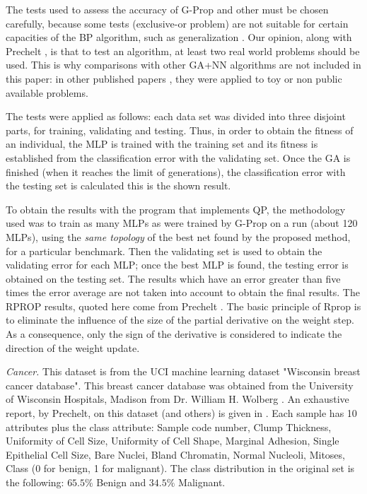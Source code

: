 \documentclass{elsart}
\begin{document}
The tests used to assess the accuracy of G-Prop and other must be chosen carefully, because some tests (exclusive-or problem) are not suitable for certain capacities of the BP algorithm, such as generalization \cite{FahlmanBENCHMARKS}. Our opinion, along with Prechelt \cite{Prechelt94c}, is that to test an algorithm, at least two real world problems should be used.
This is why comparisons with other GA+NN algorithms are not included in this paper: in other published papers \cite{White,Miller,Kitano90,Gruau92}, they were applied to toy or non public available problems.

The tests were applied as follows: each data set was divided into three disjoint parts, for training, validating and testing. Thus, in order to obtain the fitness of an individual, the MLP is trained with the training set and its fitness is established from the classification error with the validating set. 
Once the GA is finished (when it reaches the limit of generations), the classification error with the testing set is calculated this is the shown result.

To obtain the results with the program that implements QP, the methodology used was to train as many MLPs as were trained by G-Prop on a run (about 120 MLPs), using the \emph{same topology} of the best net found by the proposed method, for a particular benchmark. Then the validating set is used to obtain the validating error for each MLP; once the best MLP is found, the testing error is obtained on the testing set. 
The results which have an error greater than five times the error average are not taken into account to obtain the final results.
The RPROP results, quoted here come from Prechelt \cite{Prechelt94c}. 
The basic principle of Rprop is to eliminate the influence of the size of the partial derivative on the weight step. As a consequence, only the sign of the derivative is considered to indicate the direction of the weight update.


\emph{Cancer.}
This dataset is from the UCI machine learning dataset "Wisconsin breast cancer database". This breast cancer database was obtained from the University of Wisconsin  Hospitals, Madison from Dr. William H. Wolberg \cite{Wolberg}.
An exhaustive report, by Prechelt, on this dataset (and others) is given in \cite{Prechelt94c}.
Each sample has 10 attributes plus the class attribute: Sample code number, Clump Thickness, Uniformity of Cell Size, Uniformity of Cell Shape, Marginal Adhesion, Single Epithelial Cell Size, Bare Nuclei, Bland Chromatin, Normal Nucleoli, Mitoses, Class (0 for benign, 1 for malignant).
The class distribution in the original set is the following: $65.5\%$ Benign and $34.5\%$ Malignant.
\end{document}
